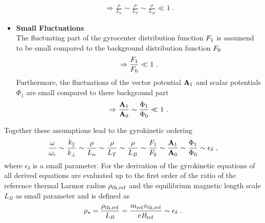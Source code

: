 \begin{itemize}
\begin{itemize}
		\end{itemize}
		\begin{gather*}
			\Rightarrow \frac{\rho}{L_n} \sim \frac{\rho}{L_T} \sim \frac{\rho}{L_B}\ll 1~.
		\end{gather*}
	\item \textbf{Small Fluctuations}\\
		The fluctuating part of the gyrocenter distribution function $F_1$ is assumend to be small compared to the background distribution function $F_0$ 
		\begin{gather*}
			\Rightarrow \frac{F_1}{F_0} \ll 1~.
		\end{gather*}
		Furthermore, the fluctuations of the vector potential $\boldsymbol{\mathbf{A}}_1$ and scalar potentials $\Phi_1$ are small compared to there background part
		\begin{gather*}
			\Rightarrow \frac{\boldsymbol{\mathbf{A}}_1}{\boldsymbol{\mathbf{A}}_0} \sim \frac{\Phi_1}{\Phi_0}  \ll 1~.
		\end{gather*}
\end{itemize}
Together these assumptions lead to the gyrokinetic ordering
\begin{gather}
	\frac{\omega}{\omega_\mathrm{c}} \sim \frac{k_\parallel}{k_\perp} \sim \frac{\rho}{L_n} \sim \frac{\rho}{L_T} \sim \frac{\rho}{L_B} \sim \frac{F_1}{F_0} \sim \frac{\boldsymbol{\mathbf{A}}_1}{\boldsymbol{\mathbf{A}}_0} \sim \frac{\Phi_1}{\Phi_0} \sim \epsilon_\delta~,
\end{gather}
where $\epsilon_\delta$ is a small parameter. For the derivation of the gyrokinetic equations of {\gkw} all derived equations are evaluated up to the first order of the ratio of the reference thermal Larmor radius $\rho_{\mathrm{th},\mathrm{ref}}$ and the equilibrium magnetic length scale $L_B$ as small parameter and is defined as
\begin{gather}
	\rho_\star = \frac{\rho_{\mathrm{th},\mathrm{ref}}}{L_B} = \frac{m_\mathrm{ref} v_{\mathrm{th},\mathrm{ref}}}{e B_\mathrm{ref}} \sim \epsilon_\delta~.
	\label{eq:rhostar}
\end{gather}